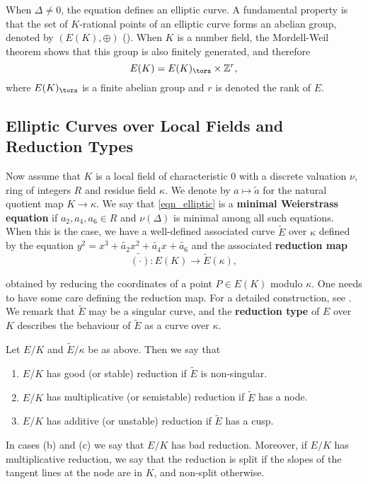 When $\Delta\neq0$, the equation defines an elliptic curve. A fundamental property is that the set of $K$-rational points of an elliptic curve forms an abelian group, denoted by $(E(K),\oplus)$ (\cite[\S III.2]{S1}). When $K$ is a number field, the Mordell-Weil theorem shows that this group is also finitely generated, and therefore 
$$E(K)=E(K)_{\tors}\times\ZZ^r,$$
where $E(K)_{\tors}$ is a finite abelian group and $r$ is denoted the rank of $E$.

\subsection{Elliptic Curves over Local Fields and Reduction Types}

Now assume that $K$ is a local field of characteristic $0$ with a discrete valuation $\nu$, ring of integers $R$ and residue field $\kappa$. We denote by $a\mapsto \tilde{a}$ for the natural quotient map $K\to\kappa$. We say that \eqref{eqn_elliptic} is a \textbf{minimal Weierstrass equation} if $a_2,a_4,a_6\in R$ and $\nu(\Delta)$ is minimal among all such equations. When this is the case, we have a well-defined associated curve $\tilde{E}$ over $\kappa$ defined by the equation $y^2=x^3+\tilde{a_2}x^2+\tilde{a_4}x+\tilde{a_6}$ and the associated \textbf{reduction map}
\begin{equation}\label{eqn_reduction}
    \widetilde{(\cdot)}:E(K)\longrightarrow \tilde{E}(\kappa),
\end{equation}

obtained by reducing the coordinates of a point $P\in E(K)$ modulo $\kappa$. One needs to have some care defining the reduction map. For a detailed construction, see \cite[\S1 VII.2]{S1}. We remark that $\tilde{E}$ may be a singular curve, and the \textbf{reduction type} of $E$ over $K$ describes the behaviour of $\tilde{E}$ as a curve over $\kappa$.

\begin{defn}
    Let $E/K$ and $\tilde{E}/\kappa$ be as above. Then we say that 
    \begin{enumerate}[label={(\alph*)}]
        \item $E/K$ has good (or stable) reduction if $\tilde{E}$ is non-singular.
        \item $E/K$ has multiplicative (or semistable) reduction if $\tilde{E}$ has a node.
        \item $E/K$ has additive (or unstable) reduction if $\tilde{E}$ has a cusp.
    \end{enumerate}
    In cases (b) and (c) we say that $E/K$ has bad reduction. Moreover, if $E/K$ has multiplicative reduction, we say that the reduction is split if the slopes of the tangent lines at the node are in $K$, and non-split otherwise.
\end{defn}

